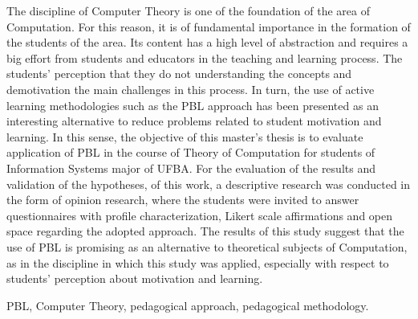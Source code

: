 \abstract
The discipline of Computer Theory is one of the foundation
of the area of Computation. For this reason, it is of fundamental
importance in the formation of the students of the area.
Its content has a high level of abstraction and requires a
big effort from students and educators in the teaching and
learning process.
The students' perception that they do not understanding the
concepts and demotivation the main challenges
in this process.
In turn, the use of active learning methodologies such as
the \ac{PBL} approach has been presented as an interesting
alternative to reduce problems related to student motivation
and learning.
In this sense, the objective of this master's thesis is
to evaluate application of \ac{PBL} in
the course of Theory of Computation for students of
Information Systems major of \ac{UFBA}.
For the evaluation of the results and validation
of the hypotheses, of this work, a descriptive
research was conducted in the form of opinion research,
where the students were invited to answer questionnaires with
profile characterization, Likert scale affirmations
and open space regarding the adopted approach.
The results of this study suggest that the use
of \ac{PBL} is promising as an alternative to theoretical
subjects of Computation, as in the discipline in which this
study was applied, especially with respect to
students' perception about motivation and learning.
\begin{keywords}
\ac{PBL}, Computer Theory, pedagogical approach,
pedagogical methodology.
\end{keywords}
